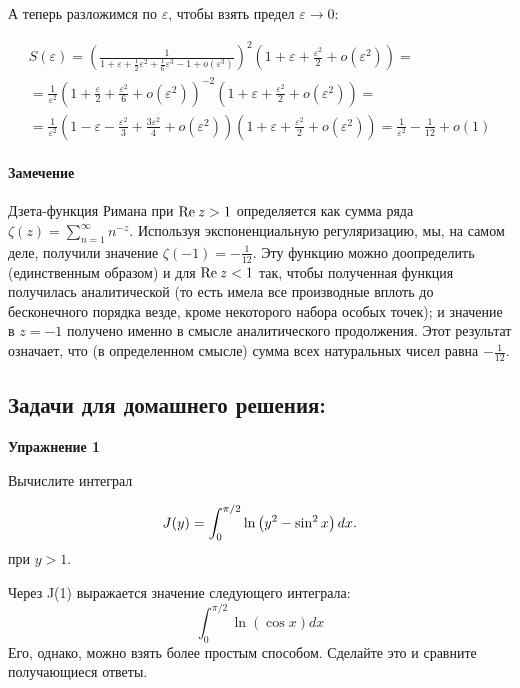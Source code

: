 \documentclass[a4paper,12pt]{article}
\begin{document}
\noindent
А теперь разложимся по $\varepsilon$, чтобы взять предел $\varepsilon\to0$:

\begin{multline*}
S\left(\varepsilon\right)=\left(\frac{1}{1+\varepsilon+\frac{1}{2}\varepsilon^{2}+\frac{1}{6}\varepsilon^{3}-1+o(\varepsilon^{3})}\right)^{2}\left(1+\varepsilon+\frac{\varepsilon^{2}}{2}+o(\varepsilon^{2})\right)=\\
=\frac{1}{\varepsilon^{2}}\left(1+\frac{\varepsilon}{2}+\frac{\varepsilon^{2}}{6}+o(\varepsilon^{2})\right)^{-2}\left(1+\varepsilon+\frac{\varepsilon^{2}}{2}+o(\varepsilon^{2})\right)=\\
=\frac{1}{\varepsilon^{2}}\left(1-\varepsilon-\frac{\varepsilon^{2}}{3}+\frac{3\varepsilon^{2}}{4}+o(\varepsilon^{2})\right)\left(1+\varepsilon+\frac{\varepsilon^{2}}{2}+o(\varepsilon^{2})\right)=\frac{1}{\varepsilon^{2}}-\frac{1}{12}+o(1)
\end{multline*}



\paragraph{Замечение}

Дзета-функция Римана при ${\rm Re}\:z>1$ определяется как сумма ряда
$\zeta(z)=\sum_{n=1}^{\infty}n^{-z}$. Используя экспоненциальную
регуляризацию, мы, на самом деле, получили значение $\zeta(-1)=-\frac{1}{12}$.
Эту функцию можно доопределить (единственным образом) и для ${\rm Re}\:z<1$
так, чтобы полученная функция получилась аналитической (то есть имела
все производные вплоть до бесконечного порядка везде, кроме некоторого
набора особых точек); и значение в $z=-1$ получено именно в смысле
аналитического продолжения. Этот результат означает, что (в определенном
смысле) сумма всех натуральных чисел равна $-\frac{1}{12}$.


\subsection*{Задачи для домашнего решения:}

\noindent \textbf{Упражнение 1}

\noindent Вычислите интеграл 

\begin{equation}
J(y)=\int_{0}^{\pi/2}\ln\left(y^2-\sin^2x\right)dx.\notag
\end{equation}
при $y>1$. 

\noindent
Через J(1) выражается значение следующего интеграла:
$$
\int_{0}^{\pi/2}\ln\left(\cos x\right) dx
$$
Его, однако, можно взять более простым способом. Сделайте это и сравните получающиеся ответы.
\end{document}
